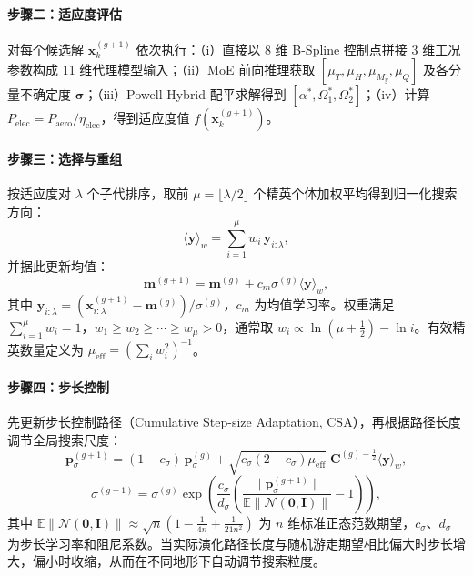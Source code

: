 \paragraph{步骤二：适应度评估}
对每个候选解 $\mathbf{x}_k^{(g+1)}$ 依次执行：（i）直接以 8 维 B-Spline 控制点拼接 3 维工况参数构成 11 维代理模型输入；（ii）MoE 前向推理获取 $[\mu_T,\mu_H,\mu_{M_y},\mu_Q]$ 及各分量不确定度 $\boldsymbol{\sigma}$；（iii）Powell Hybrid 配平求解得到 $[\alpha^*,\Omega_1^*,\Omega_2^*]$；（iv）计算 $P_\text{elec} = P_\text{aero}/\eta_\text{elec}$，得到适应度值 $f(\mathbf{x}_k^{(g+1)})$。

\paragraph{步骤三：选择与重组}
按适应度对 $\lambda$ 个子代排序，取前 $\mu = \lfloor\lambda/2\rfloor$ 个精英个体加权平均得到归一化搜索方向：
\begin{equation}
\langle\mathbf{y}\rangle_w = \sum_{i=1}^{\mu} w_i\,\mathbf{y}_{i:\lambda},
\end{equation}
并据此更新均值：
\begin{equation}
\mathbf{m}^{(g+1)} = \mathbf{m}^{(g)} + c_m\sigma^{(g)}\langle\mathbf{y}\rangle_w,
\end{equation}
其中 $\mathbf{y}_{i:\lambda}=(\mathbf{x}_{i:\lambda}^{(g+1)}-\mathbf{m}^{(g)})/\sigma^{(g)}$，$c_m$ 为均值学习率。权重满足 $\sum_{i=1}^{\mu}w_i = 1$，$w_1 \geq w_2 \geq \cdots \geq w_\mu > 0$，通常取 $w_i \propto \ln(\mu+\tfrac{1}{2}) - \ln i$。有效精英数量定义为 $\mu_\text{eff} = \left(\sum_i w_i^2\right)^{-1}$。

\paragraph{步骤四：步长控制}
先更新步长控制路径（Cumulative Step-size Adaptation, CSA），再根据路径长度调节全局搜索尺度：
\begin{equation}
\mathbf{p}_\sigma^{(g+1)} = (1-c_\sigma)\,\mathbf{p}_\sigma^{(g)}
  + \sqrt{c_\sigma(2-c_\sigma)\mu_\text{eff}}\;\mathbf{C}^{(g)-\frac{1}{2}}\langle\mathbf{y}\rangle_w,
\end{equation}
\begin{equation}
\sigma^{(g+1)} = \sigma^{(g)}\exp\!\left(\frac{c_\sigma}{d_\sigma}\left(\frac{\|\mathbf{p}_\sigma^{(g+1)}\|}{\mathbb{E}\|\mathcal{N}(\mathbf{0},\mathbf{I})\|} - 1\right)\right),
\end{equation}
其中 $\mathbb{E}\|\mathcal{N}(\mathbf{0},\mathbf{I})\| \approx \sqrt{n}\left(1 - \frac{1}{4n} + \frac{1}{21n^2}\right)$ 为 $n$ 维标准正态范数期望，$c_\sigma$、$d_\sigma$ 为步长学习率和阻尼系数。当实际演化路径长度与随机游走期望相比偏大时步长增大，偏小时收缩，从而在不同地形下自动调节搜索粒度。

